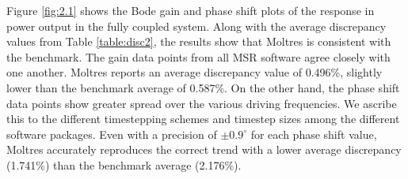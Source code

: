 Figure \ref{fig:2.1} shows the Bode gain and phase shift plots of the response
in power output in the fully coupled system. Along with the average discrepancy
values from Table \ref{table:disc2}, the results show that Moltres is
consistent with the benchmark. The gain data points from all \gls{MSR} software
agree closely with one another. Moltres reports an average discrepancy value of
0.496\%, slightly lower than the benchmark average of 0.587\%. On the other
hand, the phase shift data points show greater spread over the various driving
frequencies. We ascribe this to the different timestepping schemes and timestep
sizes among the different software packages. Even with a precision of
$\pm0.9^\circ$ for each phase shift value, Moltres accurately reproduces the
correct trend with a lower average discrepancy (1.741\%) than the benchmark
average (2.176\%).

\FloatBarrier
